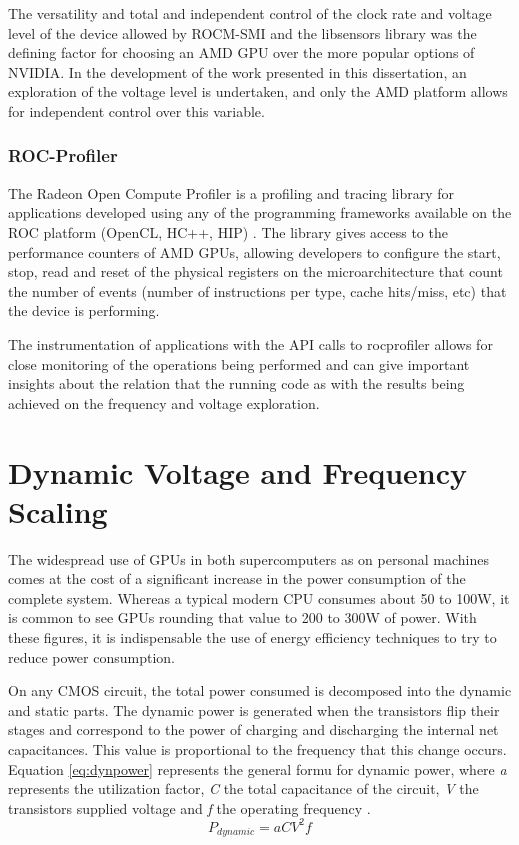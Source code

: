 The versatility and total and independent control of the clock rate and voltage level of the device allowed by ROCM-SMI and the libsensors library was the defining factor for choosing an AMD GPU over the more popular options of NVIDIA. In the development of the work presented in this dissertation, an exploration of the voltage level is undertaken, and only the AMD platform allows for independent control over this variable.

\subsubsection{ROC-Profiler}

The Radeon Open Compute Profiler \cite{noauthor_rocm-developer-tools/rocprofiler_2019} is a profiling and tracing library for applications developed using any of the programming frameworks available on the ROC platform (OpenCL, HC++, HIP) \cite{sun_evaluating_2018}. The library gives access to the performance counters of AMD GPUs, allowing developers to configure the start, stop, read and reset of the physical registers on the microarchitecture that count the number of events (number of instructions per type, cache hits/miss, etc) that the device is performing.

The instrumentation of applications with the API calls to rocprofiler allows for close monitoring of the operations being performed and can give important insights about the relation that the running code as with the results being achieved on the frequency and voltage exploration.




\section{Dynamic Voltage and Frequency Scaling}
\label{section:dcvf}

The widespread use of GPUs in both supercomputers as on personal machines comes at the cost of a significant increase in the power consumption of the complete system. Whereas a typical modern CPU consumes about 50 to 100W, it is common to see GPUs rounding that value to 200 to 300W of power. With these figures, it is indispensable the use of energy efficiency techniques to try to reduce power consumption.

On any CMOS circuit, the total power consumed is decomposed into the dynamic and static parts. The dynamic power is generated when the transistors flip their stages and correspond to the power of charging and discharging the internal net capacitances. This value is proportional to the frequency that this change occurs. Equation \ref{eq:dynpower} represents the general formu for dynamic power, where \textit{a} represents the utilization factor, \textit{C} the total capacitance of the circuit, \textit{V} the transistors supplied voltage and \textit{f} the operating frequency \cite{gonzalez_supply_1997}.
\begin{equation}
    P_{dynamic} = aCV^2f
    \label{eq:dynpower}
\end{equation}


